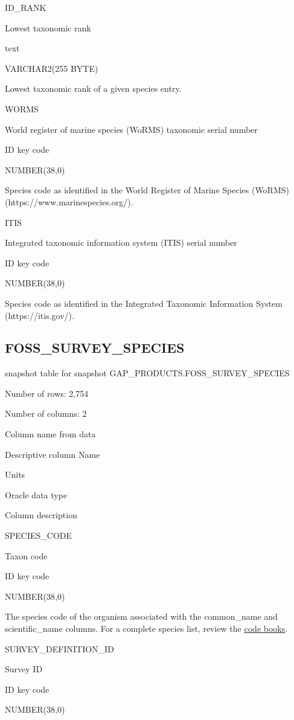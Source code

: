 \documentclass[
  letterpaper,
  oneside,
  open=any]{scrbook}
\begin{document}
ID\_RANK

Lowest taxonomic rank

text

VARCHAR2(255 BYTE)

Lowest taxonomic rank of a given species entry.

WORMS

World register of marine species (WoRMS) taxonomic serial number

ID key code

NUMBER(38,0)

Species code as identified in the World Register of Marine Species
(WoRMS) (https://www.marinespecies.org/).

ITIS

Integrated taxonomic information system (ITIS) serial number

ID key code

NUMBER(38,0)

Species code as identified in the Integrated Taxonomic Information
System (https://itis.gov/).

\subsection{FOSS\_SURVEY\_SPECIES}\label{foss_survey_species}

snapshot table for snapshot GAP\_PRODUCTS.FOSS\_SURVEY\_SPECIES

Number of rows: 2,754

Number of columns: 2

Column name from data

Descriptive column Name

Units

Oracle data type

Column description

SPECIES\_CODE

Taxon code

ID key code

NUMBER(38,0)

The species code of the organism associated with the common\_name and
scientific\_name columns. For a complete species list, review the
\href{https://www.fisheries.noaa.gov/resource/document/groundfish-survey-species-code-manual-and-data-codes-manual}{code
books}.

SURVEY\_DEFINITION\_ID

Survey ID

ID key code

NUMBER(38,0)
\end{document}
